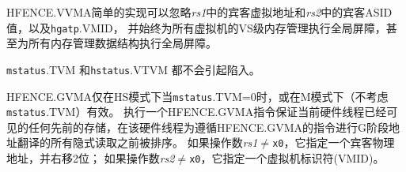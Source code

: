\begin{commentary}
  HFENCE.VVMA简单的实现可以忽略{\em rs1}中的宾客虚拟地址和{\em rs2}中的宾客ASID值，以及{\tt hgatp}.VMID，
  并始终为所有虚拟机的VS级内存管理执行全局屏障，甚至为所有内存管理数据结构执行全局屏障。
\end{commentary}

{\tt mstatus}.TVM 和{\tt hstatus}.VTVM 都不会引起陷入。

HFENCE.GVMA仅在HS模式下当{\tt mstatus}.TVM=0时，或在M模式下（不考虑{\tt mstatus}.TVM）有效。
执行一个HFENCE.GVMA指令保证当前硬件线程已经可见的任何先前的存储，在该硬件线程为遵循HFENCE.GVMA的指令进行G阶段地址翻译的所有隐式读取之前被排序。
如果操作数{\em rs1}$\neq${\tt x0}，它指定一个宾客物理地址，并右移2位；
如果操作数{\em rs2}$\neq${\tt x0}，它指定一个虚拟机标识符(VMID)。

